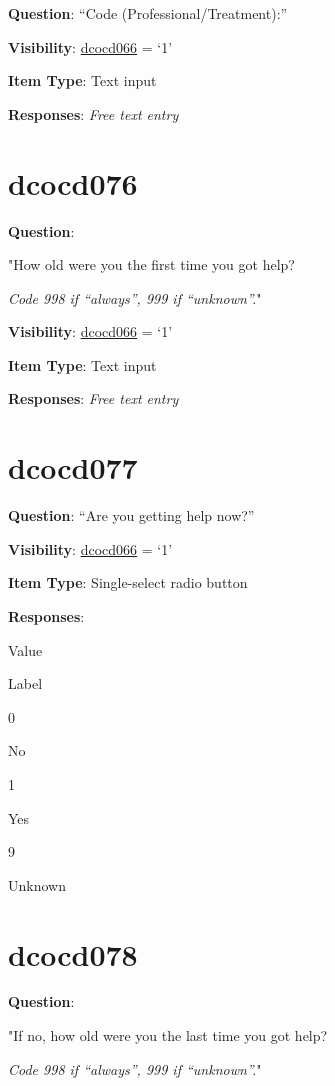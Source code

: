 \documentclass[]{book}
\begin{document}
\textbf{Question}: ``Code (Professional/Treatment):''

\textbf{Visibility}: \protect\hyperlink{dcocd066}{dcocd066} = `1'

\textbf{Item Type}: Text input

\textbf{Responses}: \emph{Free text entry}

\hypertarget{dcocd076}{%
\section{dcocd076}\label{dcocd076}}

\textbf{Question}:

"How old were you the first time you got help?

\emph{Code 998 if ``always'', 999 if ``unknown''.}"

\textbf{Visibility}: \protect\hyperlink{dcocd066}{dcocd066} = `1'

\textbf{Item Type}: Text input

\textbf{Responses}: \emph{Free text entry}

\hypertarget{dcocd077}{%
\section{dcocd077}\label{dcocd077}}

\textbf{Question}: ``Are you getting help now?''

\textbf{Visibility}: \protect\hyperlink{dcocd066}{dcocd066} = `1'

\textbf{Item Type}: Single-select radio button

\textbf{Responses}:

Value

Label

0

No

1

Yes

9

Unknown

\hypertarget{dcocd078}{%
\section{dcocd078}\label{dcocd078}}

\textbf{Question}:

"If no, how old were you the last time you got help?

\emph{Code 998 if ``always'', 999 if ``unknown''.}"
\end{document}
